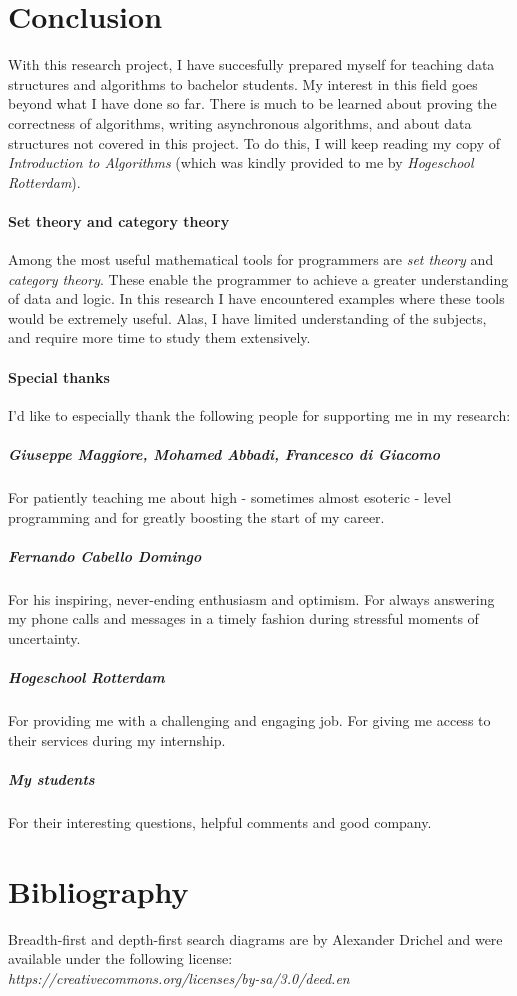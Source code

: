 \documentclass{article}
\begin{document}
\newpage


\section{Conclusion}
With this research project, I have succesfully prepared myself for teaching data structures and algorithms to bachelor students.
My interest in this field goes beyond what I have done so far. There is much to be learned about proving the correctness of
algorithms, writing asynchronous algorithms, and about data structures not covered in this project. To do this, I will keep
reading my copy of {\em Introduction to Algorithms} (which was kindly provided to me by {\em Hogeschool Rotterdam}).

\paragraph{Set theory and category theory}
Among the most useful mathematical tools for programmers are {\em set theory} and {\em category theory}. These enable the
programmer to achieve a greater understanding of data and logic. In this research I have encountered examples where these
tools would be extremely useful. Alas, I have limited understanding of the subjects, and require more time to study them
extensively.

\paragraph{Special thanks}
I'd like to especially thank the following people for supporting me in my research:

\subparagraph{Giuseppe Maggiore, Mohamed Abbadi, Francesco di Giacomo}
For patiently teaching me about high - sometimes almost esoteric - level programming and for greatly boosting the start of my
career.

\subparagraph{Fernando Cabello Domingo}
For his inspiring, never-ending enthusiasm and optimism. For always answering my phone calls and messages in a timely fashion
during stressful moments of uncertainty.

\subparagraph{Hogeschool Rotterdam}
For providing me with a challenging and engaging job. For giving me access to their services during my internship.

\subparagraph{My students}
For their interesting questions, helpful comments and good company.


\newpage


\section{Bibliography}

Breadth-first and depth-first search diagrams are by Alexander Drichel and were available under the following license: \\
{\em https://creativecommons.org/licenses/by-sa/3.0/deed.en}
\end{document}
